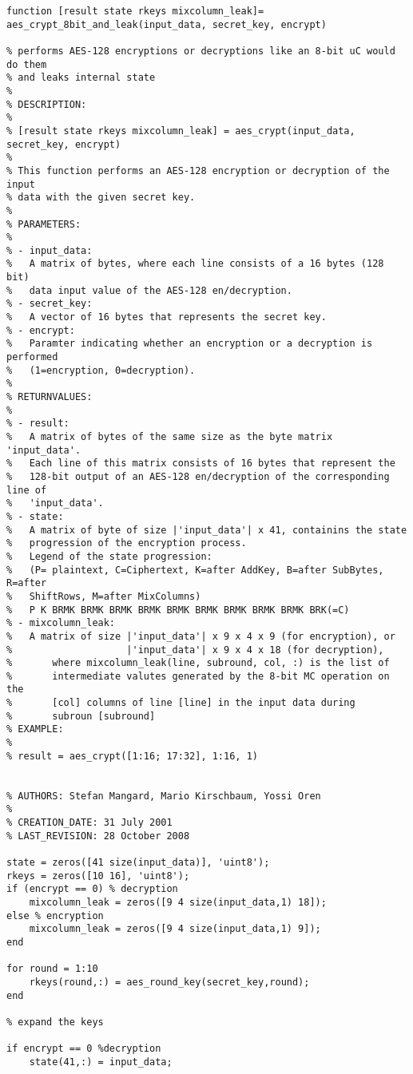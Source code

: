 \documentclass{report}
\begin{document}
\begin{verbatim}
function [result state rkeys mixcolumn_leak]= 
aes_crypt_8bit_and_leak(input_data, secret_key, encrypt)

% performs AES-128 encryptions or decryptions like an 8-bit uC would do them
% and leaks internal state 
%
% DESCRIPTION:
%
% [result state rkeys mixcolumn_leak] = aes_crypt(input_data, secret_key, encrypt)
%
% This function performs an AES-128 encryption or decryption of the input
% data with the given secret key.
%
% PARAMETERS:
%
% - input_data:
%   A matrix of bytes, where each line consists of a 16 bytes (128 bit)
%   data input value of the AES-128 en/decryption.
% - secret_key:
%   A vector of 16 bytes that represents the secret key.
% - encrypt:
%   Paramter indicating whether an encryption or a decryption is performed
%   (1=encryption, 0=decryption).
%
% RETURNVALUES:
%
% - result:
%   A matrix of bytes of the same size as the byte matrix 'input_data'.
%   Each line of this matrix consists of 16 bytes that represent the
%   128-bit output of an AES-128 en/decryption of the corresponding line of
%   'input_data'.
% - state:
%   A matrix of byte of size |'input_data'| x 41, containins the state
%   progression of the encryption process.  
%   Legend of the state progression:
%   (P= plaintext, C=Ciphertext, K=after AddKey, B=after SubBytes, R=after
%   ShiftRows, M=after MixColumns)
%   P K BRMK BRMK BRMK BRMK BRMK BRMK BRMK BRMK BRMK BRK(=C)
% - mixcolumn_leak:
%   A matrix of size |'input_data'| x 9 x 4 x 9 (for encryption), or
%                    |'input_data'| x 9 x 4 x 18 (for decryption),
%       where mixcolumn_leak(line, subround, col, :) is the list of
%       intermediate valutes generated by the 8-bit MC operation on the
%       [col] columns of line [line] in the input data during
%       subroun [subround]
% EXAMPLE:
%
% result = aes_crypt([1:16; 17:32], 1:16, 1)


% AUTHORS: Stefan Mangard, Mario Kirschbaum, Yossi Oren
%
% CREATION_DATE: 31 July 2001
% LAST_REVISION: 28 October 2008

state = zeros([41 size(input_data)], 'uint8');
rkeys = zeros([10 16], 'uint8');
if (encrypt == 0) % decryption
    mixcolumn_leak = zeros([9 4 size(input_data,1) 18]);
else % encryption
    mixcolumn_leak = zeros([9 4 size(input_data,1) 9]);
end

for round = 1:10
    rkeys(round,:) = aes_round_key(secret_key,round);
end

% expand the keys

if encrypt == 0 %decryption
    state(41,:) = input_data;


\end{verbatim}
\end{document}
